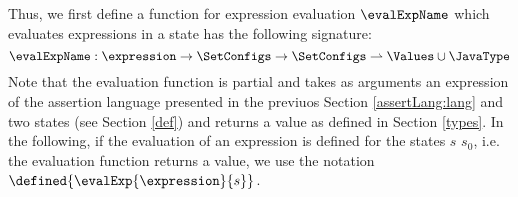 Thus, we first define a function for expression evaluation
 $\evalExpName$ which evaluates expressions in a state has the following signature:
$$
\evalExpName : \expression \rightarrow \SetConfigs  \rightarrow \SetConfigs  \rightharpoonup \Values \cup \JavaType
$$
Note that the evaluation function is partial and  takes as arguments an expression of the assertion language presented in the previuos Section 
\ref{assertLang:lang} and two states (see Section \ref{def})  and returns a value as defined in Section \ref{types}. In the following,
if the evaluation   of an expression \expression{} is defined for the states $s$ $s_0$, i.e. the evaluation function returns a value,
  we use the notation  $\defined{ \evalExp{\expression}{s}}$.  








